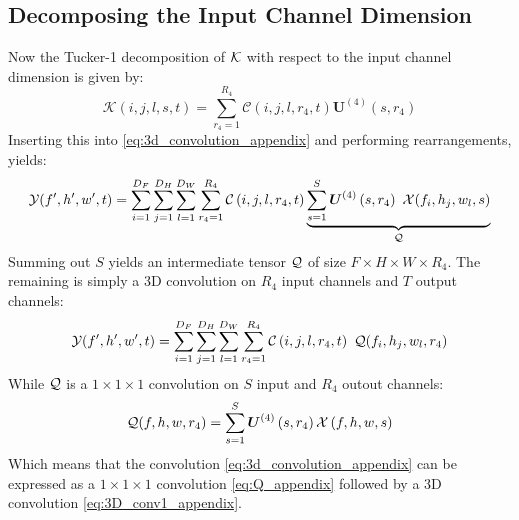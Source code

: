 \subsection{Decomposing the Input Channel Dimension}
Now the Tucker-1 decomposition of $\mathcal{K}$ with respect to the input channel dimension is given by:
\begin{equation}
    \mathcal{K}(i, j, l, s, t)=\sum_{r_{4}=1}^{R_{4}} \mathcal{C}\left(i, j, l, r_{4}, t\right) \boldsymbol{U}^{(4)}\left(s, r_{4}\right)
\end{equation}
Inserting this into \eqref{eq:3d_convolution_appendix} and performing rearrangements, yields:
\begin{equation}
    \mathcal{Y}(f', h', w', t) = \sum_{i=1}^{D_F} \sum_{j=1}^{D_H} \sum_{l=1}^{D_W}  \sum_{r_{4}=1}^{R_{4}} \mathcal{C}\left(i, j, l, r_{4}, t\right) \underbrace{\sum_{s=1}^{S} \boldsymbol{U}^{(4)}\left(s, r_{4}\right) \ \mathcal{X}(f_i, h_j, w_l, s)}_{\mathcal{Q}}
\end{equation}
Summing out $S$ yields an intermediate tensor $\mathcal{Q}$ of size $F\times H\times W \times R_4$. The remaining is simply a 3D convolution on $R_4$ input channels and $T$ output channels:
\begin{equation}
    \mathcal{Y}(f', h', w', t) = \sum_{i=1}^{D_F} \sum_{j=1}^{D_H} \sum_{l=1}^{D_W}  \sum_{r_{4}=1}^{R_{4}} \mathcal{C}\left(i, j, l, r_{4}, t\right) \ \mathcal{Q} (f_i, h_j, w_l, r_4)
    \label{eq:3D_conv1_appendix}
\end{equation}
While $\mathcal{Q}$ is a $1\times 1\times 1$ convolution on $S$ input and $R_4$ outout channels:
\begin{equation}
    \mathcal{Q}(f, h, w, r_4) = \sum_{s=1}^{S} \boldsymbol{U}^{(4)}\left(s, r_{4}\right) \mathcal{X}\left(f, h, w, s\right)
    \label{eq:Q_appendix}
\end{equation}
Which means that the convolution \eqref{eq:3d_convolution_appendix} can be expressed as a $1\times 1\times 1$ convolution \eqref{eq:Q_appendix} followed by a 3D convolution \eqref{eq:3D_conv1_appendix}. 

